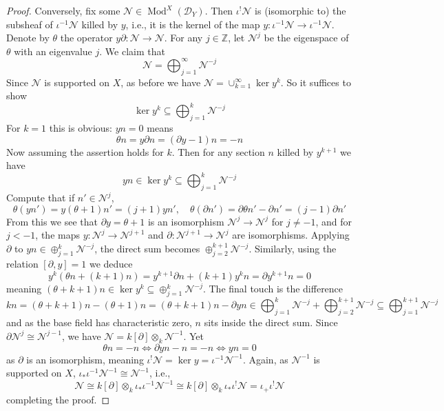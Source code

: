 \documentclass[11pt, a4paper]{article}
\theoremstyle{definition}
\newcommand{\Z}[0]{\mathbb{Z}}
\newcommand{\Mod}{\operatorname{Mod}}
\begin{document}
\begin{proof}
        Conversely, fix some $\mathcal N\in\Mod^X(\mathcal D_Y)$. Then $\iota^!\mathcal N$ is (isomorphic to) the subsheaf of $\iota^{-1}\mathcal N$ killed by $y$, i.e., it is the kernel of the map $y:\iota^{-1}\mathcal N\to\iota^{-1}\mathcal N$. Denote by $\theta$ the operator $y\partial:\mathcal N\to\mathcal N$. For any $j\in\Z$, let $\mathcal N^j$ be the eigenspace of $\theta$ with an eigenvalue $j$. We claim that
        \[\mathcal N=\bigoplus_{j=1}^\infty\mathcal N^{-j}\]
        Since $\mathcal N$ is supported on $X$, as before we have $\mathcal N=\cup_{k=1}^\infty \ker y^k$. So it suffices to show
        \[\ker y^k\subseteq \bigoplus_{j=1}^k\mathcal N^{-j}\]
        For $k=1$ this is obvious: $yn=0$ means
        \[\theta n=y\partial n=(\partial y-1)n=-n\]
        Now assuming the assertion holds for $k$. Then for any section $n$ killed by $y^{k+1}$ we have
        \[yn\in\ker y^k\subseteq\bigoplus_{j=1}^k\mathcal N^{-j}\]
        Compute that if $n'\in\mathcal N^j$,
        \[\theta (yn')=y(\theta+1)n'=(j+1)yn', \quad \theta(\partial n')=\partial \theta n'-\partial n'=(j-1)\partial n'\]
        From this we see that $\partial y=\theta+1$ is an isomorphism $\mathcal N^j\to\mathcal N^j$ for $j\neq -1$, and for $j<-1$, the maps $y:\mathcal N^{j}\to\mathcal N^{j+1}$ and $\partial:\mathcal N^{j+1}\to\mathcal N^{j}$ are isomorphisms. Applying $\partial$ to $yn\in\oplus_{j=1}^{k}\mathcal N^{-j}$, the direct sum becomes $\oplus_{j=2}^{k+1}\mathcal N^{-j}$. Similarly, using the relation $[\partial, y]=1$ we deduce
        \[y^k(\theta n+(k+1)n)=y^{k+1}\partial n+(k+1)y^kn=\partial y^{k+1}n=0\]
        meaning $(\theta+k+1)n\in\ker y^k\subseteq\oplus_{j=1}^k\mathcal N^{-j}$. The final touch is the difference
        \[kn=(\theta+k+1)n-(\theta+1)n=(\theta+k+1)n-\partial yn\in\bigoplus_{j=1}^k\mathcal N^{-j}+\bigoplus_{j=2}^{k+1}\mathcal N^{-j}\subseteq\bigoplus_{j=1}^{k+1}\mathcal N^{-j}\]
        and as the base field has characteristic zero, $n$ sits inside the direct sum. Since $\partial \mathcal N^{j}\cong\mathcal N^{j-1}$, we have $\mathcal N=k[\partial]\otimes_{k}\mathcal N^{-1}$. Yet
        \[\theta n=-n\iff \partial yn-n=-n\iff yn=0\]
        as $\partial$ is an isomorphism, meaning $\iota^!\mathcal N=\ker y=\iota^{-1}\mathcal N^{-1}$. Again, as $\mathcal N^{-1}$ is supported on $X$, $\iota_*\iota^{-1}\mathcal N^{-1}\cong\mathcal N^{-1}$, i.e., 
        \[\mathcal N\cong k[\partial]\otimes_k\iota_*\iota^{-1}\mathcal N^{-1}\cong k[\partial]\otimes_k\iota_*\iota^!\mathcal N=\iota_+\iota^!\mathcal N\]
        completing the proof.
    \end{proof}
\end{document}
